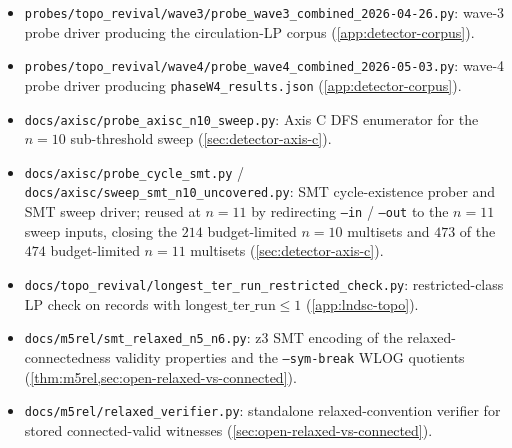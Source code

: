 \documentclass[11pt,a4paper]{article}
\theoremstyle{plain}
\theoremstyle{definition}
\begin{document}
\begin{itemize}[leftmargin=*]
 $\{2^3, 4, 3^{n-4}\}$ at $n = 8, 9$ and the four LCM-functional
 readings (\cref{sec:lower-arg}).
\item \texttt{probes/topo\_revival/wave3/probe\_wave3\_combined\_2026-04-26.py}: wave-3 probe driver producing the circulation-LP corpus
 (\cref{app:detector-corpus}).
\item \texttt{probes/topo\_revival/wave4/probe\_wave4\_combined\_2026-05-03.py}: wave-4 probe driver producing \texttt{phaseW4\_results.json}
 (\cref{app:detector-corpus}).
\item \texttt{docs/axisc/probe\_axisc\_n10\_sweep.py}: Axis C DFS
 enumerator for the $n = 10$ sub-threshold sweep
 (\cref{sec:detector-axis-c}).
\item \texttt{docs/axisc/probe\_cycle\_smt.py} / \texttt{docs/axisc/sweep\_smt\_n10\_uncovered.py}: SMT cycle-existence prober and SMT sweep driver; reused at
 $n = 11$ by redirecting \texttt{--in} / \texttt{--out} to the
 $n = 11$ sweep inputs, closing the $214$ budget-limited $n = 10$
 multisets and $473$ of the $474$ budget-limited $n = 11$
 multisets (\cref{sec:detector-axis-c}).
\item \texttt{docs/topo\_revival/longest\_ter\_run\_restricted\_check.py}: restricted-class LP check on records with
 $\mathrm{longest\_ter\_run} \le 1$ (\cref{app:lndsc-topo}).
\item \texttt{docs/m5rel/smt\_relaxed\_n5\_n6.py}: z3 SMT encoding of the relaxed-connectedness validity
 properties and the \texttt{--sym-break} WLOG quotients
 (\cref{thm:m5rel,sec:open-relaxed-vs-connected}).
\item \texttt{docs/m5rel/relaxed\_verifier.py}: standalone relaxed-convention verifier for stored
 connected-valid witnesses (\cref{sec:open-relaxed-vs-connected}).
\end{itemize}
\end{document}
